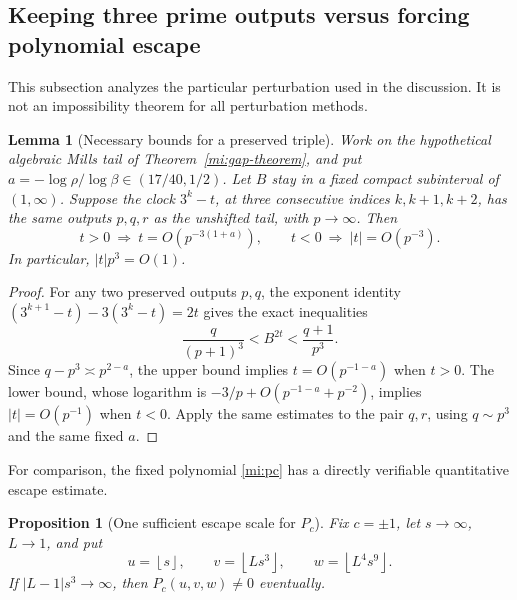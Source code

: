 \documentclass[11pt,a4paper]{article}
\numberwithin{equation}{section}
\newtheorem{lemma}[theorem]{Lemma}
\newtheorem{proposition}[theorem]{Proposition}
\theoremstyle{definition}
\theoremstyle{remark}
\newcommand{\floor}[1]{\left\lfloor #1\right\rfloor}
\begin{document}
\subsection{Keeping three prime outputs versus forcing polynomial escape}
\label{mi:small-shift}

This subsection analyzes the particular perturbation used in the
discussion. It is not an impossibility theorem for all perturbation
methods.

\begin{lemma}[Necessary bounds for a preserved triple]
\label{mi:preserve}
Work on the hypothetical algebraic Mills tail of
Theorem~\ref{mi:gap-theorem}, and put
\(a=-\log\rho/\log\beta\in(17/40,1/2)\).
Let \(B\) stay in a fixed compact subinterval of \((1,\infty)\).
Suppose the clock \(3^k-t\), at three consecutive indices
\(k,k+1,k+2\), has the same outputs \(p,q,r\) as the
unshifted tail, with \(p\to\infty\). Then
\[
 t>0\ \Longrightarrow\ t=O(p^{-3(1+a)}),\qquad
 t<0\ \Longrightarrow\ |t|=O(p^{-3}).
\]
In particular, \(|t|p^3=O(1)\).
\end{lemma}

\begin{proof}
For any two preserved outputs \(p,q\), the exponent identity
\((3^{k+1}-t)-3(3^k-t)=2t\) gives the exact inequalities
\begin{equation}\label{mi:ratio-window}
 \frac{q}{(p+1)^3}<B^{2t}<\frac{q+1}{p^3}.
\end{equation}
Since \(q-p^3\asymp p^{2-a}\), the upper bound implies
\(t=O(p^{-1-a})\) when \(t>0\).
The lower bound, whose logarithm is
\(-3/p+O(p^{-1-a}+p^{-2})\), implies
\(|t|=O(p^{-1})\) when \(t<0\).
Apply the same estimates to the pair \(q,r\), using
\(q\sim p^3\) and the same fixed \(a\).
\end{proof}

For comparison, the fixed polynomial \eqref{mi:pc} has a
directly verifiable quantitative escape estimate.

\begin{proposition}[One sufficient escape scale for \(P_c\)]
\label{mi:escape-scale}
Fix \(c=\pm1\), let \(s\to\infty\), \(L\to1\), and put
\[
 u=\floor{s},\qquad v=\floor{Ls^3},\qquad
 w=\floor{L^4s^9}.
\]
If \(|L-1|s^3\to\infty\), then \(P_c(u,v,w)\ne0\)
eventually.
\end{proposition}
\end{document}
